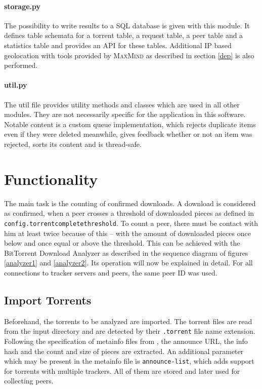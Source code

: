 \documentclass[10pt, a4paper, twoside, headsepline]{scrbook}
\renewcommand{\_}{\origunderscore\allowbreak}
\newcommand{\config}[1]{\texttt{config.\allowbreak #1}}
\begin{document}
\paragraph{storage.py} The possibility to write results to a SQL database is given with this module. It defines table schemata for a torrent table, a request table, a peer table and a statistics table and provides an API for these tables. Additional IP based geolocation with tools provided by \textsc{MaxMind} as described in section \ref{dep} is also performed.

\paragraph{util.py} The util file provides utility methods and classes which are used in all other modules. They are not necessarily specific for the application in this software. Notable content is a custom queue implementation, which rejects duplicate items even if they were deleted meanwhile, gives feedback whether or not an item was rejected, sorts its content and is thread-safe.

\section{Functionality}
\label{func}
The main task is the counting of confirmed downloads. A download is considered as confirmed, when a peer crosses a threshold of downloaded pieces as defined in \config{torrent\_complete\_threshold}. To count a peer, there must be contact with him at least twice because of this -- with the amount of downloaded pieces once below and once equal or above the threshold. This can be achieved with the BitTorrent Download Analyzer as described in the sequence diagram of figures \ref{analyzer1} and \ref{analyzer2}. Its operation will now be explained in detail. For all connections to tracker servers and peers, the same peer ID was used.

\subsection{Import Torrents}
Beforehand, the torrents to be analyzed are imported. The torrent files are read from the input directory and are detected by their \texttt{.torrent} file name extension. Following the specification of metainfo files from \cite{bep3}, the announce URL, the info hash and the count and size of pieces are extracted. An additional parameter which may be present in the metainfo file is \texttt{announce-list}, which adds support for torrents with multiple trackers. All of them are stored and later used for collecting peers.
\end{document}
